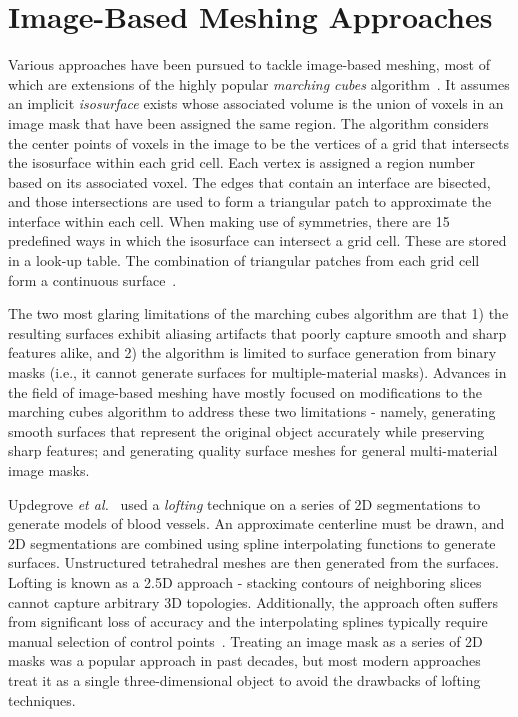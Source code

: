 \section{Image-Based Meshing Approaches}
\label{Image-Based Meshing Approaches}

Various approaches have been pursued to tackle image-based meshing, most of which are extensions of the highly popular \textit{marching cubes} algorithm~\cite{lorensen_1987}. It assumes an implicit \textit{isosurface} exists whose associated volume is the union of voxels in an image mask that have been assigned the same region. The algorithm considers the center points of voxels in the image to be the vertices of a grid that intersects the isosurface within each grid cell. Each vertex is assigned a region number based on its associated voxel. The edges that contain an interface are bisected, and those intersections are used to form a triangular patch to approximate the interface within each cell. When making use of symmetries, there are 15 predefined ways in which the isosurface can intersect a grid cell. These are stored in a look-up table. The combination of triangular patches from each grid cell form a continuous surface~\cite{young_2008}.

The two most glaring limitations of the marching cubes algorithm are that 1) the resulting surfaces exhibit aliasing artifacts that poorly capture smooth and sharp features alike, and 2) the algorithm is limited to surface generation from binary masks (i.e., it cannot generate surfaces for multiple-material masks). Advances in the field of image-based meshing have mostly focused on modifications to the marching cubes algorithm to address these two limitations - namely, generating smooth surfaces that represent the original object accurately while preserving sharp features; and generating quality surface meshes for general multi-material image masks.

Updegrove \textit{et al.}~\cite{updegrove_2016} used a \textit{lofting} technique on a series of 2D segmentations to generate models of blood vessels. An approximate centerline must be drawn, and 2D segmentations are combined using spline interpolating functions to generate surfaces. Unstructured tetrahedral meshes are then generated from the surfaces. Lofting is known as a 2.5D approach - stacking contours of neighboring slices cannot capture arbitrary 3D topologies. Additionally, the approach often suffers from significant loss of accuracy and the interpolating splines typically require manual selection of control points~\cite{young_2008}. Treating an image mask as a series of 2D masks was a popular approach in past decades, but most modern approaches treat it as a single three-dimensional object to avoid the drawbacks of lofting techniques.

